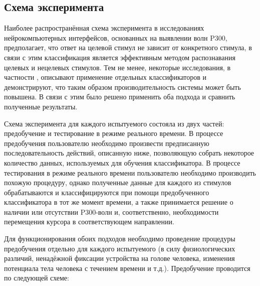 \documentclass[12pt,a4paper,oneside,fleqn,leqno]{article}
\begin{document}
\subsection{Схема эксперимента}
	\par Наиболее распространённая схема эксперимента в исследованиях нейрокомпьютерных интерфейсов, основанных на выявлении волн P300, предполагает, что ответ на целевой стимул не зависит от конкретного стимула, в связи с этим классификация является эффективным методом распознавания целевых и нецелевых стимулов. Тем не менее, некоторые исследования, в частности \cite{ensemble}, описывают применение отдельных классификаторов и демонстрируют, что таким образом производительность системы может быть повышена. В связи с этим было решено применить оба подхода и сравнить полученные результаты.
	\par Схема эксперимента для каждого испытуемого состояла из двух частей: предобучение и тестирование в режиме реального времени. В процессе предобучения пользователю необходимо произвести предписанную последовательность действий, описанную ниже, позволяющую собрать некоторое количество данных, используемых для обучения классификатора. В процессе тестирования в режиме реального времени пользователю необходимо производить похожую процедуру, однако полученные данные для каждого из стимулов обрабатываются и классифицируются при помощи предобученного классификатора в тот же момент времени, а также принимается решение о наличии или отсутствии P300-волн и, соответственно, необходимости перемещения курсора в соответствующем направлении.
	\par Для функционирования обоих подходов необходимо проведение процедуры предобучения отдельно для каждого испытуемого (в силу физиологических различий, ненадёжной фиксации устройства на голове человека, изменения потенциала тела человека с течением времени и т.д.). Предобучение проводится по следующей схеме:
\end{document}
